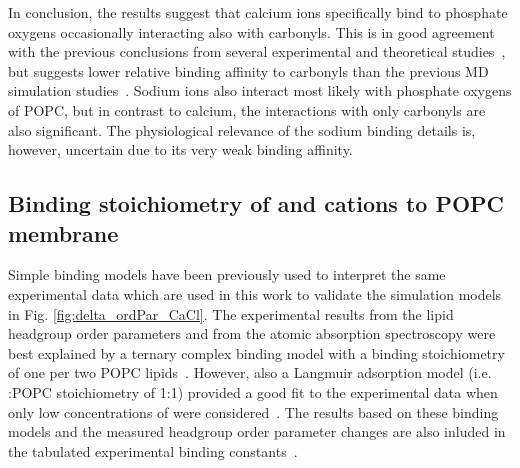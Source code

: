 \documentclass[aip,jcp,twocolumn]{revtex4}
\begin{document}
In conclusion, the results suggest that calcium ions specifically bind to phosphate
oxygens occasionally interacting also with carbonyls. This is in good agreement
with the previous conclusions from several experimental and theoretical
studies~\cite{hauser76,hauser78,herbette84,cevc90,binder02}, but
suggests lower relative binding affinity to carbonyls than the previous MD simulation
studies~\cite{bockmann03,bockmann04,melcrova16,javanainen17}.
Sodium ions also interact most likely with phosphate oxygens of POPC, 
but in contrast to calcium, the interactions with only carbonyls are also significant.
The physiological relevance of the sodium binding details is, however, uncertain
due to its very weak binding affinity.

\subsection{Binding stoichiometry of  and  cations to POPC membrane}


Simple binding models have been previously used to interpret
the same experimental data \cite{altenbach84,macdonald87} 
which are used in this work to validate the simulation models in Fig. \ref{fig:delta_ordPar_CaCl}.
The experimental results from the lipid headgroup order parameters and from the
atomic absorption spectroscopy were best
explained by a ternary complex binding model with a binding
stoichiometry of one  per two POPC lipids~\cite{altenbach84}.
However, also a Langmuir adsorption model (i.e. :POPC stoichiometry of 1:1) 
provided a good fit to the experimental data when only low concentrations of  were considered~\cite{macdonald87}.
The results based on these binding models and the measured headgroup order parameter changes
are also inluded in the tabulated experimental binding constants~\cite{marsh13}.
\end{document}
